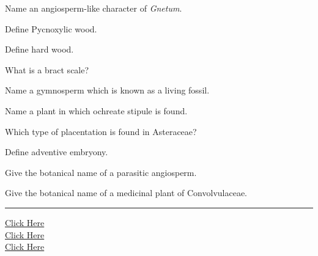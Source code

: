 \documentclass[11pt,a4paper]{article}
\begin{document}
\begin{parts}
  \item Name an angiosperm-like character of   \textit{Gnetum}.
  \item Define Pycnoxylic wood.
  \item Define hard wood.
  \item What is a bract scale?
  \item Name a gymnosperm which is known as a living fossil.
  \item Name a plant in which ochreate stipule is found.
  \item Which type of placentation is found in Asteraceae?
  \item Define adventive embryony.
  \item Give the botanical name of a parasitic angiosperm.
  \item Give the botanical name of a medicinal plant of Convolvulaceae.
\end{parts}

\vfill
\rule{\linewidth}{0.4pt}

\begin{center}\small
\href{https://bhu-exam.vercel.app/}{Click Here}\\[4pt]\href{https://me-aryan.vercel.app/}{Click Here}\\[4pt]\href{https://quashan-me.vercel.app/}{Click Here}
\end{center}
\end{document}
